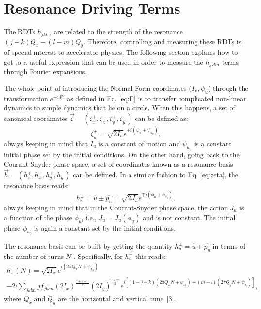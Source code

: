 \section{\label{sec:rdts}Resonance Driving Terms} 

The RDTs $h_{jklm}$ are related to the strength of the resonance $\left( j-k \right) Q_x + \left( l-m\right) Q_y$. Therefore, controlling and measuring these RDTs is of special interest to accelerator physics. The following section explains how to get to a useful expression that can be used in order to measure the $h_{jklm}$ terms through Fourier expansions.

The whole point of introducing the Normal Form coordinates ($I_u,\psi_u$) through the transformation $e^{-:F:}$ as defined in Eq. \ref{eq:F} is to transfer complicated non-linear dynamics to simple dynamics that lie on a circle. When this happens, a set of canonical coordinates $\vec{\zeta} = \left( \zeta_x^+ , \zeta_x^-, \zeta_y^+, \zeta_y^-\right)$ can be defined as:
\begin{equation}
    \label{eq:zeta}
    \zeta_u^{\pm}=\sqrt{2I_u}e^{\mp i\left( \psi_u + \psi_{u_0}\right)},
\end{equation}
always keeping in mind that $I_u$ is a constant of motion and $\psi_{u_0}$ is a constant initial phase set by the initial conditions. On the other hand, going back to the Courant-Snyder phase space, a set of coordinates known as a resonance basis $\vec{h} = \left( h_x^+ , h_x^-, h_y^+, h_y^-\right)$ can be defined. In a similar fashion to Eq. \ref{eq:zeta}, the resonance basis reads:
\begin{equation}
    \label{eq:hbasis}
    h_u^{\pm}=\hat{u}\pm \hat{p_u}=\sqrt{2J_u}e^{\mp i\left( \phi_u + \phi_{u_0}\right)},
\end{equation}
always keeping in mind that in the Courant-Snyder phase space, the action $J_u$ is a function of the phase $\phi_u$, i.e., $J_u = J_u(\phi_u)$ and is not constant. The initial phase $\phi_{u_0}$ is again a constant set by the initial conditions. 

The resonance basis can be built by getting the quantity $h_u^{\pm}=\hat{u}\pm \hat{p_u}$ in terms of the number of turns $N$ . Specifically, for $h_x^{-}$ this reads:
\begin{multline}
    \label{eq:hx-}
    h_x^{-}(N)=\sqrt{2I_x}e^{i\left( 2\pi Q_x N +\psi_{x_0}\right)} \\
    -2i \sum_{jklm} j f_{jklm} \left( 2I_x \right)^{\frac{j+k-1}{2}}\left( 2I_y \right)^{\frac{l+m}{2}}
    e^{i \left[ \left( 1-j+k\right)\left( 2\pi Q_x N + \psi_{x_0} \right) +\left( m-l\right)\left( 2\pi Q_y N + \psi_{y_0} \right)\right]},
\end{multline}
where $Q_x$ and $Q_y$ are the horizontal and vertical tune~[3]. 

